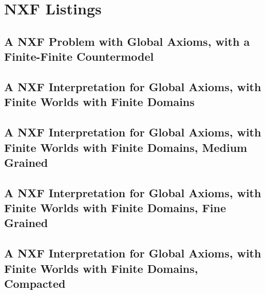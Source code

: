 \documentclass{easychair}
\begin{document}
\newpage
\section{NXF Listings}
\label{NXFListings}

\subsection{A NXF Problem with Global Axioms, with a Finite-Finite Countermodel}
\label{NTF_Finite-Finite-Global.p}
\begin{small}

\end{small}

\newpage
\subsection{A NXF Interpretation for Global Axioms, with Finite Worlds with Finite Domains}
\label{NTF_Finite-Finite-Global.s}
\begin{small}

\end{small}

\newpage
\subsection{A NXF Interpretation for Global Axioms, with Finite Worlds with Finite Domains, Medium Grained}
\label{NTF_Finite-Finite-Global_Medium.s}
\begin{small}

\end{small}

\newpage
\subsection{A NXF Interpretation for Global Axioms, with Finite Worlds with Finite Domains, Fine Grained}
\label{NTF_Finite-Finite-Global_Fine.s}
\begin{small}

\end{small}

\newpage
\subsection{A NXF Interpretation for Global Axioms, with Finite Worlds with Finite Domains, Compacted}
\label{NTF_Finite-Finite-Global_Compact.s}
\begin{small}

\end{small}
\end{document}
